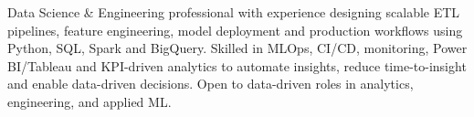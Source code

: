\begin{justify}
\small{Data Science \& Engineering professional with experience designing scalable ETL pipelines, feature engineering, model deployment and production workflows using Python, SQL, Spark and BigQuery. 
Skilled in MLOps, CI/CD, monitoring, Power BI/Tableau and KPI-driven analytics to automate insights, reduce time-to-insight and enable data-driven decisions. Open to data-driven roles in analytics, engineering, and applied ML. }
\end{justify}
\vspace{-15pt}
